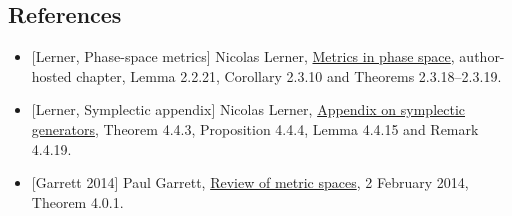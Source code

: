 \documentclass[
  11pt,
]{article}
\providecommand{\tightlist}{%
  \setlength{\itemsep}{0pt}\setlength{\parskip}{0pt}}
\begin{document}
\subsection{References}\label{references}

\begin{itemize}
\tightlist
\item
  {[}Lerner, Phase-space metrics{]} Nicolas Lerner,
  \href{https://webusers.imj-prg.fr/~nicolas.lerner/ch2booklerner.pdf}{Metrics
  in phase space}, author-hosted chapter, Lemma 2.2.21, Corollary 2.3.10
  and Theorems 2.3.18--2.3.19.
\item
  {[}Lerner, Symplectic appendix{]} Nicolas Lerner,
  \href{https://webusers.imj-prg.fr/~nicolas.lerner/ch4booklerner.pdf}{Appendix
  on symplectic generators}, Theorem 4.4.3, Proposition 4.4.4, Lemma
  4.4.15 and Remark 4.4.19.
\item
  {[}Garrett 2014{]} Paul Garrett,
  \href{https://www-users.cse.umn.edu/~garrett/m/fun/notes_2012-13/01_metric_spaces.pdf}{Review
  of metric spaces}, 2 February 2014, Theorem 4.0.1.
\end{itemize}
\end{document}
